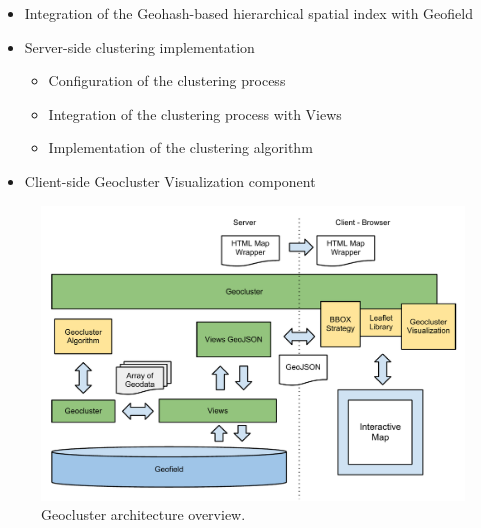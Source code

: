 \begin{itemize}

\item Integration of the Geohash-based hierarchical spatial index with Geofield

\item Server-side clustering implementation
  \begin{itemize}
   \item Configuration of the clustering process
   \item Integration of the clustering process with Views
   \item Implementation of the clustering algorithm
  \end{itemize}

\item Client-side Geocluster Visualization component

\end{itemize}


\begin{figure}[h]
  \begin{center}
    \includegraphics[width=1\textwidth]{figures/geocluster_architecture.pdf}
    \caption{Geocluster architecture overview.}
    \label{fig:geocluster-architecture}
  \end{center}
\end{figure}

